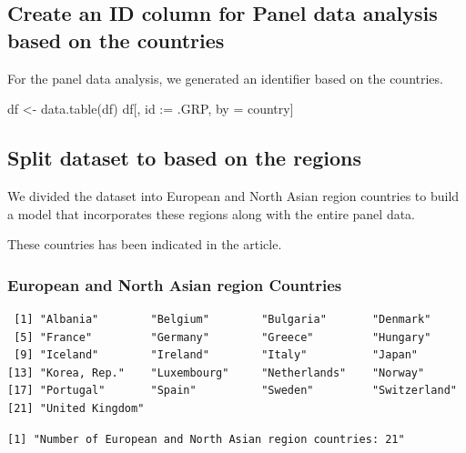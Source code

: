 \documentclass[
  11pt,
]{article}
\newenvironment{Shaded}{\begin{snugshade}}{\end{snugshade}}
\newcommand{\ErrorTok}[1]{\textcolor[rgb]{0.68,0.00,0.00}{#1}}
\newcommand{\FunctionTok}[1]{\textcolor[rgb]{0.28,0.35,0.67}{#1}}
\newcommand{\NormalTok}[1]{\textcolor[rgb]{0.00,0.23,0.31}{#1}}
\newcommand{\OtherTok}[1]{\textcolor[rgb]{0.00,0.23,0.31}{#1}}
\newcommand{\SpecialCharTok}[1]{\textcolor[rgb]{0.37,0.37,0.37}{#1}}
\begin{document}
\hypertarget{create-an-id-column-for-panel-data-analysis-based-on-the-countries}{%
\subsection{Create an ID column for Panel data analysis based on the
countries}\label{create-an-id-column-for-panel-data-analysis-based-on-the-countries}}

For the panel data analysis, we generated an identifier based on the
countries.

\begin{Shaded}
\begin{Highlighting}[]
\NormalTok{df }\OtherTok{\textless{}{-}} \FunctionTok{data.table}\NormalTok{(df)}
\NormalTok{df[, id }\SpecialCharTok{:}\ErrorTok{=}\NormalTok{ .GRP, by }\OtherTok{=}\NormalTok{ country]}
\end{Highlighting}
\end{Shaded}

\hypertarget{split-dataset-to-based-on-the-regions}{%
\subsection{Split dataset to based on the
regions}\label{split-dataset-to-based-on-the-regions}}

We divided the dataset into European and North Asian region countries to
build a model that incorporates these regions along with the entire
panel data.

These countries has been indicated in the article.

\hypertarget{european-and-north-asian-region-countries}{%
\subsubsection{European and North Asian region
Countries}\label{european-and-north-asian-region-countries}}

\begin{verbatim}
 [1] "Albania"        "Belgium"        "Bulgaria"       "Denmark"       
 [5] "France"         "Germany"        "Greece"         "Hungary"       
 [9] "Iceland"        "Ireland"        "Italy"          "Japan"         
[13] "Korea, Rep."    "Luxembourg"     "Netherlands"    "Norway"        
[17] "Portugal"       "Spain"          "Sweden"         "Switzerland"   
[21] "United Kingdom"
\end{verbatim}

\begin{verbatim}
[1] "Number of European and North Asian region countries: 21"
\end{verbatim}
\end{document}
